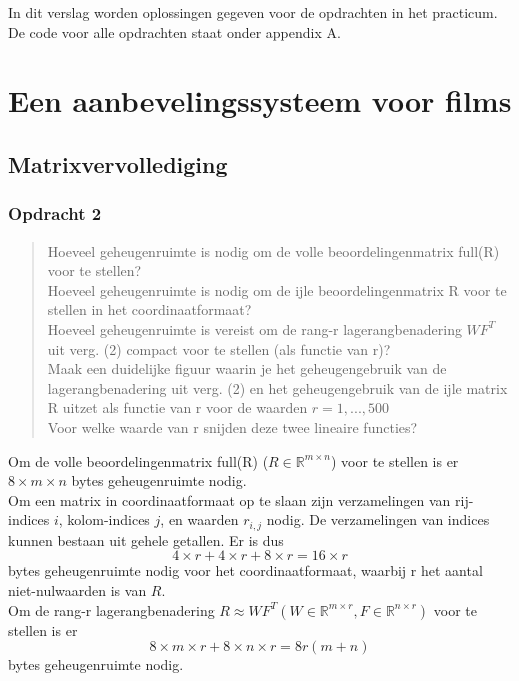 \documentclass[11pt, a4paper, titlepage, openright]{article}
\begin{document}

\tableofcontents
\newpage

In dit verslag worden oplossingen gegeven voor de opdrachten in het practicum.
De code voor alle opdrachten staat onder appendix A.

\section{Een aanbevelingssysteem voor films}
	\subsection{Matrixvervollediging}

	\subsubsection{Opdracht 2}
	\begin{quote}
        Hoeveel geheugenruimte is nodig om de volle beoordelingenmatrix full(R) voor te stellen? \\
        Hoeveel geheugenruimte is nodig om de ijle beoordelingenmatrix R voor te stellen in het coordinaatformaat? \\
        Hoeveel geheugenruimte is vereist om de rang-r lagerangbenadering \( W F^T \) uit verg. (2) compact voor te stellen (als functie van r)? \\
        Maak een duidelijke figuur waarin je het geheugengebruik van de lagerangbenadering uit verg. (2) en het
        geheugengebruik van de ijle matrix R uitzet als functie van r voor de waarden \( r = 1, ..., 500 \) \\
        Voor welke waarde van r snijden deze twee lineaire functies?
	\end{quote}

    Om de volle beoordelingenmatrix full(R) (\( R \in \mathbb{R}^{m \times n} \)) voor te stellen
    is er \( 8 \times m \times n \) bytes geheugenruimte nodig. \\

    Om een matrix in coordinaatformaat op te slaan zijn verzamelingen van rij-indices \(i\),
    kolom-indices \(j\), en waarden \( r_{i,j} \) nodig. De verzamelingen van indices kunnen bestaan
    uit gehele getallen. Er is dus \[ 4 \times r + 4 \times r + 8 \times r = 16 \times r \] bytes
    geheugenruimte nodig voor het coordinaatformaat, waarbij r het aantal niet-nulwaarden is van \( R\). \\

    Om de rang-r lagerangbenadering \( R \approx WF^T (W \in \mathbb{R}^{m \times r}, F \in \mathbb{R}^{n \times r} ) \)
    voor te stellen is er  \[ 8 \times m \times r + 8 \times n \times r = 8r (m + n) \]  bytes geheugenruimte nodig.
\end{document}
